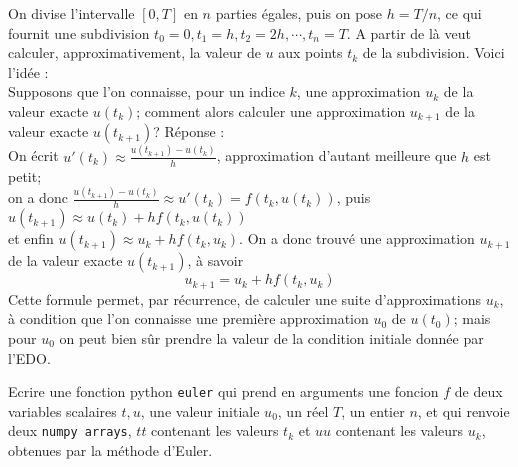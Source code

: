 \documentclass{exam}
\begin{document}
\begin{questions}
On divise l'intervalle $[0, T]$ en $n$ parties égales, puis on pose $h=T/n$, ce qui fournit une subdivision $t_0 = 0, t_1 = h, t_2 = 2h, \cdots, t_n = T$. A partir de là veut calculer, approximativement, la valeur de $u$ aux points $t_k$ de la subdivision. Voici l'idée :\\
Supposons que l'on connaisse, pour un indice $k$, une approximation $u_k$ de la valeur exacte $u(t_k)$; comment alors calculer une approximation $u_{k+1}$ de la valeur exacte $u(t_{k+1})$? Réponse :\\
On écrit $u'(t_k) \approx \frac{u(t_{k+1})-u(t_k)}{h}$, approximation d'autant meilleure que $h$ est petit;\\
 on a donc 
 $\frac{u(t_{k+1})-u(t_k)}{h} \approx u'(t_k) = f(t_k, u(t_k))$, puis $u(t_{k+1}) \approx u(t_k) + hf(t_k, u(t_k))$\\
  et enfin 
  $u(t_{k+1}) \approx u_k + hf(t_k, u_k)$. On a donc trouvé une approximation $u_{k+1}$ de la valeur exacte $u(t_{k+1})$, à savoir 
\begin{equation}
\label{euler}
u_{k+1} = u_k + hf(t_k, u_k)
\end{equation}
Cette formule permet, par récurrence, de calculer une suite d'approximations $u_k$, à condition que l'on connaisse une première approximation $u_0$ de $u(t_0)$; mais pour $u_0$ on peut bien sûr prendre la valeur de la condition initiale donnée par l'EDO.

\question
Ecrire une fonction python \texttt{euler} qui prend en arguments une foncion $f$ de deux variables scalaires $t, u$, une valeur initiale $u_0$, un réel $T$, un entier $n$, et qui renvoie deux \texttt{numpy arrays}, $tt$ contenant les valeurs $t_k$ et $uu$ contenant les valeurs $u_k$, obtenues par la méthode d'Euler.
\question
{}
\end{questions}
\end{document}
